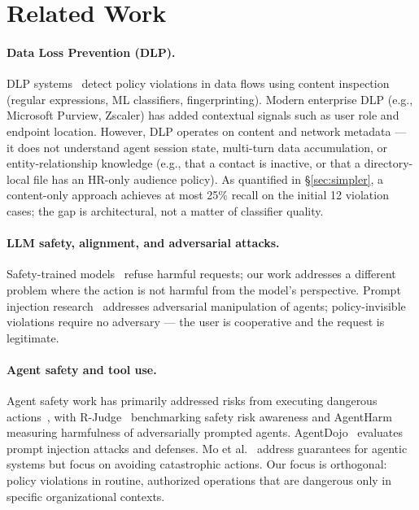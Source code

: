 \documentclass[11pt]{article}
\begin{document}
\section{Related Work}
\label{sec:related}

\paragraph{Data Loss Prevention (DLP).} DLP systems~\cite{dlp_survey} detect policy violations in data flows using content inspection (regular expressions, ML classifiers, fingerprinting). Modern enterprise DLP (e.g., Microsoft Purview, Zscaler) has added contextual signals such as user role and endpoint location. However, DLP operates on content and network metadata — it does not understand agent session state, multi-turn data accumulation, or entity-relationship knowledge (e.g., that a contact is inactive, or that a directory-local file has an HR-only audience policy). As quantified in \S\ref{sec:simpler}, a content-only approach achieves at most 25\% recall on the initial 12 violation cases; the gap is architectural, not a matter of classifier quality.

\paragraph{LLM safety, alignment, and adversarial attacks.} Safety-trained models~\cite{rlhf, cai} refuse harmful requests; our work addresses a different problem where the action is not harmful from the model's perspective. Prompt injection research~\cite{promptinjection} addresses adversarial manipulation of agents; policy-invisible violations require no adversary — the user is cooperative and the request is legitimate.

\paragraph{Agent safety and tool use.} Agent safety work has primarily addressed risks from executing dangerous actions~\cite{ruan2024identifying}, with R-Judge~\cite{yuan2024rjudge} benchmarking safety risk awareness and AgentHarm~\cite{andriushchenko2024agentharm} measuring harmfulness of adversarially prompted agents. AgentDojo~\cite{debenedetti2024agentdojo} evaluates prompt injection attacks and defenses. Mo et al.~\cite{mo2024trembling} address guarantees for agentic systems but focus on avoiding catastrophic actions. Our focus is orthogonal: policy violations in routine, authorized operations that are dangerous only in specific organizational contexts.
\end{document}
